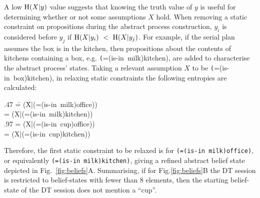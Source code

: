 A low $\entropy(X|y)$ value suggests that knowing the truth value of
$y$ is useful for determining whether or not some assumptions $X$
hold. When removing a static constraint on propositions during the
abstract process construction, $y_i$ is considered before $y_j$ if
$\entropy(X|y_i)~<~\entropy(X|y_j)$. For example, if the serial plan
assumes the box is in the kitchen, then propositions about the
contents of kitchens containing a box, e.g. {\texttt
  (=(is-in~milk)kitchen)}, are added to characterise the abstract
process' states. Taking a relevant assumption $X$ to be {\texttt
  (=(is-in~box)kitchen)}, in relaxing static constraints the following
entropies are calculated:

\small
\begin{tabtt}
.47 \= = \entropy(\=X|(=(is-in~milk)office))\+ \\
 = \entropy(X|(=(is-in~milk)kitchen)) \-\\
.97 = \entropy(X|(=(is-in~cup)office))\+\\
 = \entropy(X|(=(is-in~cup)kitchen))
\end{tabtt}
\normalsize

\noindent Therefore, the first static constraint to be relaxed is for
\texttt{(=(is-in~milk)office)}, or
equivalently \texttt{(=(is-in~milk)kitchen)}, giving a refined
abstract belief state depicted in
Fig.~\ref{fig:beliefs}A. Summarising, if for Fig.\ref{fig:beliefs}B
the DT session is restricted to belief-states with fewer than $8$
elements, then the starting belief-state of the DT session does not
mention a ``cup''.


